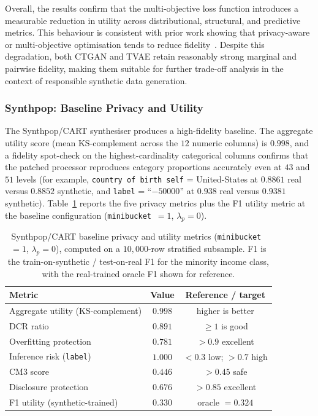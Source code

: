 \documentclass[11pt]{article}
\begin{document}
Overall, the results confirm that the multi-objective loss function introduces a measurable reduction in utility across distributional, structural, and predictive metrics. This behaviour is consistent with prior work showing that privacy-aware or multi-objective optimisation tends to reduce fidelity~\cite{stadler2022synthetic, jordon2018pategan, bowman2023utility}. Despite this degradation, both CTGAN and TVAE retain reasonably strong marginal and pairwise fidelity, making them suitable for further trade-off analysis in the context of responsible synthetic data generation.

\subsubsection{Synthpop: Baseline Privacy and Utility}

The Synthpop/CART synthesiser produces a high-fidelity baseline. The aggregate utility score (mean KS-complement across the $12$ numeric columns) is $0.998$, and a fidelity spot-check on the highest-cardinality categorical columns confirms that the patched processor reproduces category proportions accurately even at $43$ and $51$ levels (for example, \texttt{country of birth self} = United-States at $0.8861$ real versus $0.8852$ synthetic, and \texttt{label} = ``$-50000$'' at $0.938$ real versus $0.9381$ synthetic). Table~\ref{tab:synthpop-baseline} reports the five privacy metrics plus the F1 utility metric at the baseline configuration (\texttt{minibucket}~$=1$, $\lambda_p=0$).

\begin{table}[ht]
\centering
\caption{Synthpop/CART baseline privacy and utility metrics (\texttt{minibucket}~$=1$, $\lambda_p=0$), computed on a $10{,}000$-row stratified subsample. F1 is the train-on-synthetic / test-on-real F1 for the minority income class, with the real-trained oracle F1 shown for reference.}
\label{tab:synthpop-baseline}
\begin{tabular}{lcc}
\hline
\textbf{Metric} & \textbf{Value} & \textbf{Reference / target} \\
\hline
Aggregate utility (KS-complement) & $0.998$ & higher is better \\
DCR ratio & $0.891$ & $\geq 1$ is good \\
Overfitting protection & $0.781$ & $> 0.9$ excellent \\
Inference risk (\texttt{label}) & $1.000$ & $< 0.3$ low; $> 0.7$ high \\
CM3 score & $0.446$ & $> 0.45$ safe \\
Disclosure protection & $0.676$ & $> 0.85$ excellent \\
F1 utility (synthetic-trained) & $0.330$ & oracle $= 0.324$ \\
\hline
\end{tabular}
\end{table}
\end{document}
